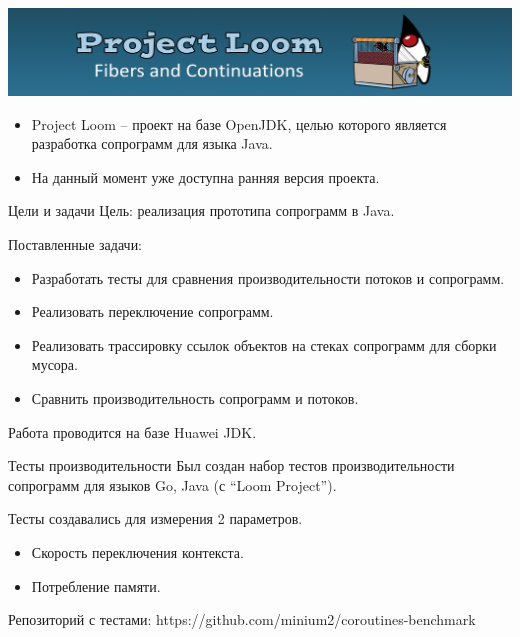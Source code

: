 \begin{frame}
	\includegraphics[scale=0.4]{images/loom.jpg}
	\begin{itemize}
		\item Project Loom – проект на базе OpenJDK, целью которого является разработка сопрограмм для языка Java. 
		\item На данный момент уже доступна ранняя версия проекта.
	\end{itemize}
\end{frame}

\begin{frame}{Цели и задачи}
	Цель: реализация прототипа сопрограмм в Java.
	\par
	Поставленные задачи:
	\begin{itemize}
		\item Разработать тесты для сравнения производительности потоков и сопрограмм.
		\item Реализовать переключение сопрограмм.
		\item Реализовать трассировку ссылок объектов на стеках сопрограмм для сборки мусора.
		\item Сравнить производительность сопрограмм и потоков. 
	\end{itemize}
	Работа проводится на базе Huawei JDK.
\end{frame} 

\begin{frame}{Тесты производительности}
	Был создан набор тестов производительности сопрограмм для языков Go, Java (с “Loom Project”).
	
	Тесты создавались для измерения 2 параметров.
	\begin{itemize}
		\item Скорость переключения контекста.
		\item Потребление памяти.
	\end{itemize}
	Репозиторий с тестами: https://github.com/minium2/coroutines-benchmark
\end{frame}

